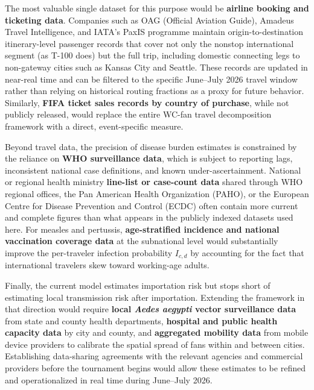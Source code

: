 \documentclass[12pt]{article}
\begin{document}
The most valuable single dataset for this purpose would be
\textbf{airline booking and ticketing data}. Companies such as OAG
(Official Aviation Guide), Amadeus Travel Intelligence, and IATA's
PaxIS programme maintain origin-to-destination itinerary-level passenger
records that cover not only the nonstop international segment (as T-100
does) but the full trip, including domestic connecting legs to non-gateway
cities such as Kansas City and Seattle. These records are updated in
near-real time and can be filtered to the specific June--July 2026 travel
window rather than relying on historical routing fractions as a proxy for
future behavior. Similarly, \textbf{FIFA ticket sales records by country
of purchase}, while not publicly released, would replace the entire
WC-fan travel decomposition framework with a direct, event-specific
measure.

Beyond travel data, the precision of disease burden estimates is
constrained by the reliance on \textbf{WHO surveillance data}, which is
subject to reporting lags, inconsistent national case definitions, and
known under-ascertainment. National or regional health ministry
\textbf{line-list or case-count data} shared through WHO regional offices,
the Pan American Health Organization (PAHO), or the European Centre for
Disease Prevention and Control (ECDC) often contain more current and
complete figures than what appears in the publicly indexed datasets used
here. For measles and pertussis, \textbf{age-stratified incidence and
national vaccination coverage data} at the subnational level would
substantially improve the per-traveler infection probability $I_{c,d}$
by accounting for the fact that international travelers skew toward
working-age adults.

Finally, the current model estimates importation risk but stops short
of estimating local transmission risk after importation. Extending the
framework in that direction would require \textbf{local
\textit{Aedes aegypti} vector surveillance data} from state and
county health departments, \textbf{hospital and public health capacity
data} by city and county, and \textbf{aggregated mobility data} from
mobile device providers to calibrate the spatial spread of fans within
and between cities. Establishing data-sharing agreements with the
relevant agencies and commercial providers before the tournament
begins would allow these estimates to be refined and operationalized
in real time during June--July 2026.

\newpage
\end{document}
